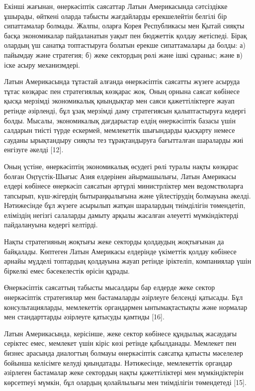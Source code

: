 \begin{multicols}{2}
Екінші жағынан, өнеркәсіптік саясаттар Латын Америкасында сәтсіздікке
ұшырады, өйткені оларда табысты жағдайларды ерекшелейтін белгілі бір
сипаттамалар болмады. Жалпы, оларға Корея Республикасы мен Қытай сияқты
басқа экономикалар пайдаланатын уақыт пен бюджеттік қолдау жетіспеді.
Бірақ олардың үш санатқа топтастыруға болатын ерекше сипаттамалары да
болды: а) пайымдау және стратегия; б) жеке сектордың рөлі және ішкі
сұраныс; және в) іске асыру механизмдері.

Латын Америкасында тұтастай алғанда өнеркәсіптік саясатты жүзеге асыруда
тұтас көзқарас пен стратегиялық көзқарас жоқ. Оның орнына саясат
көбінесе қысқа мерзімді экономикалық қиындықтар мен саяси
қажеттіліктерге жауап ретінде әзірленді, бұл ұзақ мерзімді даму
стратегиясын қалыптастыруға кедергі болды. Мысалы, экономикалық
дағдарыстар елдің өнеркәсіптік базасы үшін салдарын тиісті түрде
ескермей, мемлекеттік шығындарды қысқарту немесе сауданы ырықтандыру
сияқты тез тұрақтандыруға бағытталған шараларды жиі енгізуге әкелді
{[}12{]}.

Оның үстіне, өнеркәсіптің экономикалық өсудегі рөлі туралы нақты
көзқарас болған Оңтүстік-Шығыс Азия елдерінен айырмашылығы, Латын
Америкасы елдері көбінесе өнеркәсіп саясатын әртүрлі министрліктер мен
ведомстволарға тапсырып, күш-жігердің бытыраңқылығына және үйлестірудің
болмауына әкелді. Нәтижесінде бұл жүзеге асырылып жатқан шаралардың
тиімділігін төмендетіп, еліміздің негізгі салаларды дамыту арқылы
жасалған әлеуетті мүмкіндіктерді пайдалануына кедергі келтірді.

Нақты стратегияның жоқтығы жеке секторды қолдаудың жоқтығынан да
байқалады. Көптеген Латын Америкасы елдерінде үкіметтік қолдау көбінесе
арнайы мүдделі топтардың қолдауына жауап ретінде іріктеліп, компаниялар
үшін біркелкі емес бәсекелестік өрісін құрады.

Өнеркәсіптік саясаттың табысты мысалдары бар елдерде жеке сектор
өнеркәсіптік стратегиялар мен бастамаларды әзірлеуге белсенді қатысады.
Бұл консультацияларды, мемлекеттік органдармен ынтымақтастықты және
нормалар мен стандарттарды әзірлеуге қатысуды қамтиды {[}16{]}.

Латын Америкасында, керісінше, жеке сектор көбінесе құндылық жасаудағы
серіктес емес, мемлекет үшін кіріс көзі ретінде қабылданады. Мемлекет
пен бизнес арасында диалогтың болмауы өнеркәсіптік саясатқа қатысты
мәселелер бойынша келісімге келуді қиындатады. Нәтижесінде, мемлекеттік
органдар әзірлеген бастамалар жеке сектордың нақты қажеттіліктері мен
мүмкіндіктерін көрсетпеуі мүмкін, бұл олардың қолайлылығы мен
тиімділігін төмендетеді {[}15{]}.


\end{multicols}
